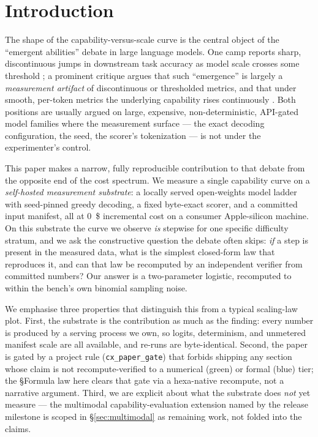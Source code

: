 \documentclass[11pt,a4paper]{article}
\begin{document}
\section{Introduction}
\label{sec:intro}
The shape of the capability-versus-scale curve is the central object of the
``emergent abilities'' debate in large language models. One camp reports
sharp, discontinuous jumps in downstream task accuracy as model scale
crosses some threshold \citep{wei2022emergent}; a prominent critique argues
that such ``emergence'' is largely a \emph{measurement artifact} of
discontinuous or thresholded metrics, and that under smooth, per-token
metrics the underlying capability rises continuously
\citep{schaeffer2023mirage}. Both positions are usually argued on large,
expensive, non-deterministic, API-gated model families where the
measurement surface --- the exact decoding configuration, the seed, the
scorer's tokenization --- is not under the experimenter's control.

This paper makes a narrow, fully reproducible contribution to that debate
from the opposite end of the cost spectrum. We measure a single capability
curve on a \emph{self-hosted measurement substrate}: a locally served
open-weights model ladder with seed-pinned greedy decoding, a fixed
byte-exact scorer, and a committed input manifest, all at \SI{0}{\$}
incremental cost on a consumer Apple-silicon machine. On this substrate the
curve we observe \emph{is} stepwise for one specific difficulty stratum, and
we ask the constructive question the debate often skips: \emph{if} a step is
present in the measured data, what is the simplest closed-form law that
reproduces it, and can that law be recomputed by an independent verifier
from committed numbers? Our answer is a two-parameter logistic, recomputed
to within the bench's own binomial sampling noise.

We emphasise three properties that distinguish this from a typical
scaling-law plot. First, the substrate is the contribution as much as the
finding: every number is produced by a serving process we own, so logits,
determinism, and unmetered manifest scale are all available, and re-runs are
byte-identical. Second, the paper is gated by a project rule
(\texttt{cx\_paper\_gate}) that forbids shipping any section whose claim is
not recompute-verified to a numerical (green) or formal (blue) tier; the
§Formula law here clears that gate via a hexa-native recompute, not a
narrative argument. Third, we are explicit about what the substrate does
\emph{not} yet measure --- the multimodal capability-evaluation extension
named by the release milestone is scoped in §\ref{sec:multimodal} as
remaining work, not folded into the claims.
\end{document}
